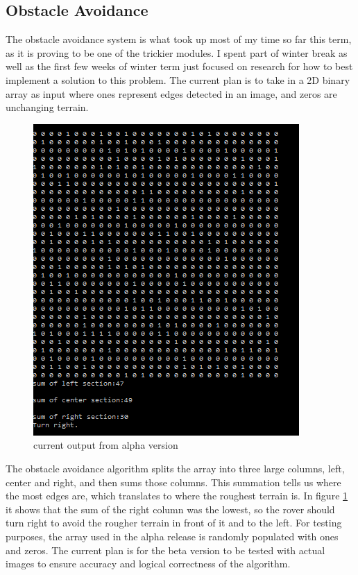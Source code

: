 \documentclass[10pt,letterpaper,onecolumn,draftclsnofoot,journal]{IEEEtran}
\begin{document}
\subsection{Obstacle Avoidance}
The obstacle avoidance system is what took up most of my time so far this term, as it is proving to be one of the trickier modules. I spent part of winter break as well as the first few weeks of winter term just focused on research for how to best implement a solution to this problem. The current plan is to take in a 2D binary array as input where ones represent edges detected in an image, and zeros are unchanging terrain.
\begin{figure}[h]
	\includegraphics[scale = .75]{obstacleavoidance.png}
	\caption{current output from alpha version}
	\label{fig:obstacle}
\end{figure}
\par
The obstacle avoidance algorithm splits the array into three large columns, left, center and right, and then sums those columns. This summation tells us where the most edges are, which translates to where the roughest terrain is. In figure \ref{fig:obstacle} it shows that the sum of the right column was the lowest, so the rover should turn right to avoid the rougher terrain in front of it and to the left. For testing purposes, the array used in the alpha release is randomly populated with ones and zeros. The current plan is for the beta version to be tested with actual images to ensure accuracy and logical correctness of the algorithm.





%
%
\end{document}
